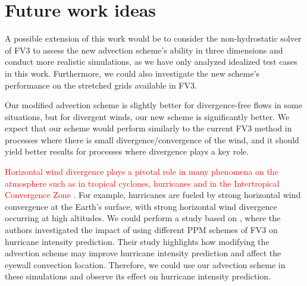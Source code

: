 \section{Future work ideas}
A possible extension of this work would be to consider the non-hydrostatic solver of FV3 to assess the new advection scheme's ability 
in three dimensions and conduct more realistic simulations, as we have only analyzed idealized test cases in this work.
Furthermore, we could also investigate the new scheme's performance on the stretched grids available in FV3.

Our modified advection scheme is slightly better for divergence-free flows in some situations, but for divergent winds, our new scheme is significantly better. 
We expect that our scheme would perform similarly to the current FV3 method in processes where there is small divergence/convergence of the wind, 
and it should yield better results for processes where divergence plays a key role.

\textcolor{red}{
Horizontal wind divergence plays a pivotal role in many phenomena on the atmosphere such as in tropical cyclones, hurricanes and in the Intertropical Convergence Zone \citet{holton:2012}}.
For example, hurricanes are fueled by strong horizontal wind convergence at the Earth's surface, with strong horizontal wind divergence occurring at high altitudes.
We could perform a study based on \citet{gao:2021}, where the authors investigated the impact of using different PPM schemes of FV3 on hurricane intensity prediction.
Their study highlights how modifying the advection scheme may improve hurricane intensity prediction and affect the eyewall convection location.
Therefore, we could use our advection scheme in these simulations and observe its effect on hurricane intensity prediction.
